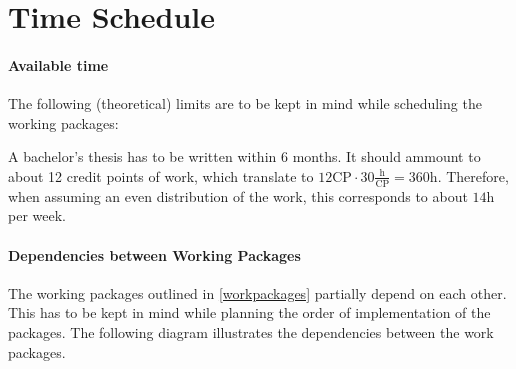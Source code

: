 \documentclass[paper=a4,nochapname,accentcolor=tud9c]{tudexercise}
\begin{document}
\section{Time Schedule}

\paragraph{Available time}
%
The following (theoretical) limits are to be kept in mind while scheduling the
working packages:

A bachelor's thesis has to be written within 6 months.
It should ammount to about 12 credit points of work, which translate to $12 \mathrm{CP} \cdot 30 \frac{\mathrm{h}}{\mathrm{CP}} = 360 \mathrm{h}$.
Therefore, when assuming an even distribution of the work, this corresponds to about $14 \mathrm{h}$ per week.

\paragraph{Dependencies between Working Packages}

The working packages outlined in \ref{workpackages} partially depend on each other.
This has to be kept in mind while planning the order of implementation of the
packages. The following diagram illustrates the dependencies between the work
packages.

\medskip
\end{document}

